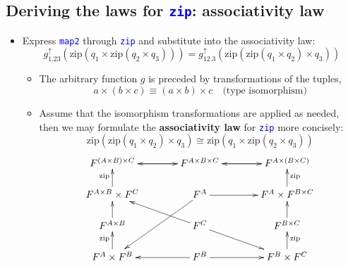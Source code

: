 \subsection{Deriving the laws for \texttt{\textcolor{blue}{\footnotesize{}zip}}:
associativity law}
\begin{itemize}
\item Express \texttt{\textcolor{blue}{\footnotesize{}map2}} through \texttt{\textcolor{blue}{\footnotesize{}zip}}
and substitute into the associativity law:{\footnotesize{}
\[
g_{1.23}^{\uparrow}\left(\text{zip}\left(q_{1}\times\text{zip}\left(q_{2}\times q_{3}\right)\right)\right)=g_{12.3}^{\uparrow}\left(\text{zip}\left(\text{zip}\left(q_{1}\times q_{2}\right)\times q_{3}\right)\right)
\]
}{\footnotesize\par}
\begin{itemize}
\item The arbitrary function $g$ is preceded by transformations of the
tuples,{\footnotesize{}
\[
a\times\left(b\times c\right)\equiv\left(a\times b\right)\times c\quad\text{(type isomorphism)}
\]
}{\footnotesize\par}
\item Assume that the isomorphism transformations are applied as needed,
then we may formulate the \textbf{associativity law} for \texttt{\textcolor{blue}{\footnotesize{}zip}}
more concisely:{\footnotesize{}
\[
\text{zip}\left(\text{zip}\left(q_{1}\times q_{2}\right)\times q_{3}\right)\cong\text{zip}\left(q_{1}\times\text{zip}\left(q_{2}\times q_{3}\right)\right)
\]
}\vspace{-0.2cm}
\[
\xymatrix{\xyScaleY{1.4pc}\xyScaleX{3pc}F^{\left(A\times B\right)\times C}\ar[r] & F^{A\times B\times C}\ar[r]\ar[l] & F^{A\times\left(B\times C\right)}\ar[l]\\
F^{A\times B}\times F^{C}\ar[u]\sp(0.6){\text{zip}} & F^{A}\ar[ldd]\ar[r] & F^{A}\times F^{B\times C}\ar[u]\sb(0.6){\text{zip}}\\
F^{A\times B}\ar[u] & F^{C}\ar[rd]\ar[lu] & F^{B\times C}\ar[u]\\
F^{A}\times F^{B}\ar[u]\sp(0.6){\text{zip}} & F^{B}\ar[r]\ar[l] & F^{B}\times F^{C}\ar[u]\sb(0.6){\text{zip}}
}
\]
\end{itemize}
\end{itemize}


